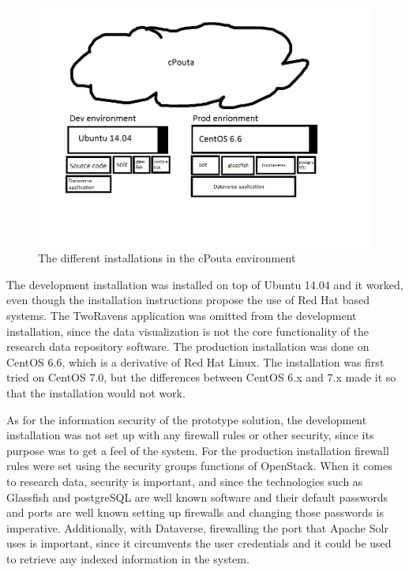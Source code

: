 \begin{figure}
    \begin{centering}
        \includegraphics[width=\textwidth]{images/cpouta}
    \end{centering}
    \caption{The different installations in the cPouta environment}
    \label{fig:cpouta}
\end{figure}

The development installation was installed on top of Ubuntu 14.04 and it
worked, even though the installation instructions propose the use of Red Hat
based systems. The TwoRavens application was omitted from the development
installation, since the data visualization is not the core functionality of
the research data repository software. The production installation was done
on CentOS 6.6, which is a derivative of Red Hat Linux. The installation was
first tried on CentOS 7.0, but the differences between CentOS 6.x and 7.x made
it so that the installation would not work.

As for the information security of the prototype solution, the development
installation was not set up with any firewall rules or other security, since
its purpose was to get a feel of the system. For the production installation
firewall rules were set using the security groups functions of OpenStack.
When it comes to research data, security is important, and since the
technologies such as Glassfish and postgreSQL are well known software and
their default passwords and ports are well known setting up firewalls and
changing those passwords is imperative. Additionally, with Dataverse,
firewalling the port that Apache Solr uses is important, since it circumvents
the user credentials and it could be used to retrieve any indexed information
in the system.

